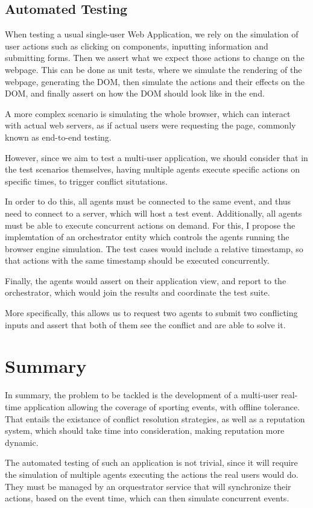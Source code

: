 \subsection{Automated Testing}

When testing a usual single-user Web Application, we rely on the simulation of user actions such as clicking on components, inputting information and submitting forms. Then we assert what we expect those actions to change on the webpage. This can be done as unit tests, where we simulate the rendering of the webpage, generating the DOM, then simulate the actions and their effects on the DOM, and finally assert on how the DOM should look like in the end. 

A more complex scenario is simulating the whole browser, which can interact with actual web servers, as if actual users were requesting the page, commonly known as end-to-end testing.

However, since we aim to test a multi-user application, we should consider that in the test scenarios themselves, having multiple agents execute specific actions on specific times, to trigger conflict situtations.

In order to do this, all agents must be connected to the same event, and thus need to connect to a server, which will host a test event. Additionally, all agents must be able to execute concurrent actions on demand. For this, I propose the implemtation of an orchestrator entity which controls the agents running the browser engine simulation. The test cases would include a relative timestamp, so that actions with the same timestamp should be executed concurrently.

Finally, the agents would assert on their application view, and report to the orchestrator, which would join the results and coordinate the test suite.

More specifically, this allows us to request two agents to submit two conflicting inputs and assert that both of them see the conflict and are able to solve it.

\section{Summary}

In summary, the problem to be tackled is the development of a multi-user real-time application allowing the coverage of sporting events, with offline tolerance. That entails the existance of conflict resolution strategies, as well as a reputation system, which should take time into consideration, making reputation more dynamic.

The automated testing of such an application is not trivial, since it will require the simulation of multiple agents executing the actions the real users would do. They must be managed by an orquestrator service that will synchronize their actions, based on the event time, which can then simulate concurrent events.


